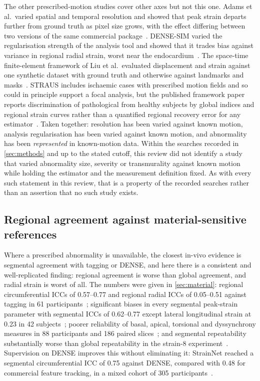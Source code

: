 The other prescribed-motion studies cover other axes but not this one. Adams et al.\ varied spatial
and temporal resolution and showed that peak strain departs further from ground truth as pixel size
grows, with the effect differing between two versions of the same commercial
package~\citep{adams2023}. DENSE-SIM varied the regularisation strength of the analysis tool and
showed that it trades bias against variance in regional radial strain, worst near the
endocardium~\citep{barbaroux2025}. The space-time finite-element framework of Liu et al.\ evaluated
displacement and strain against one synthetic dataset with ground truth and otherwise against
landmarks and masks~\citep{liu2026fe}. STRAUS includes ischaemic cases with prescribed motion fields
and so could in principle support a focal analysis, but the published framework paper reports
discrimination of pathological from healthy subjects by global indices and regional strain curves
rather than a quantified regional recovery error for any estimator~\citep{zhou2018straus}. Taken
together: resolution has been varied against known motion, analysis regularisation has been varied
against known motion, and abnormality has been \emph{represented} in known-motion data. Within the
searches recorded in \cref{sec:methods} and up to the stated cutoff, this review did not identify a
study that varied abnormality size, severity or transmurality against known motion while holding the
estimator and the measurement definition fixed. As with every such statement in this review, that is
a property of the recorded searches rather than an assertion that no such study exists.

\subsection{Regional agreement against material-sensitive references}\label{sec:regionalagreement}

Where a prescribed abnormality is unavailable, the closest in-vivo evidence is segmental agreement
with tagging or DENSE, and here there is a consistent and well-replicated finding: regional
agreement is worse than global agreement, and radial strain is worst of all. The numbers were given
in \cref{sec:material}: regional circumferential ICCs of 0.57--0.77 and regional radial ICCs of
0.05--0.51 against tagging in 61 participants~\citep{militaru2021}; significant biases in every
segmental peak-strain parameter with segmental ICCs of 0.62--0.77 except lateral longitudinal strain
at 0.23 in 42 subjects~\citep{brandt2024}; poorer reliability of basal, apical, torsional and
dyssynchrony measures in 88 participants and 186 paired slices~\citep{wehner2018}; and segmental
repeatability substantially worse than global repeatability in the strain-8
experiment~\citep{bell2025strain8}. Supervision on DENSE improves this without eliminating it:
StrainNet reached a segmental circumferential ICC of 0.75 against DENSE, compared with 0.48 for
commercial feature tracking, in a mixed cohort of 305 participants~\citep{wang2023strainnet}.

